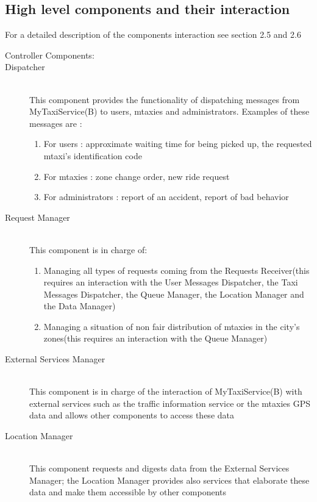\documentclass[11pt,titlepage]{article} %
\begin{document}
\subsection{High level components and their interaction}
	For a detailed description of the components interaction see section 2.5 and 2.6\newline
	\begin{description}
		\item [Controller Components:] 
		           \item [Dispatcher] \hfill \\
		           This component provides the functionality of dispatching messages from MyTaxiService(B) to users, mtaxies and administrators.\newline
		            Examples of these messages are :
			 \begin{enumerate}
			            \item For users : approximate waiting time for being picked up, the requested mtaxi's identification code
			            \item For mtaxies : zone change order, new ride request
			            \item For administrators : report of an accident, report of bad behavior
			\end{enumerate}
		        \item [Request Manager] \hfill \\
		           This component is in charge of:
			 \begin{enumerate}
			            \item Managing all types of requests coming from the Requests Receiver(this requires an
			            interaction with the User Messages Dispatcher, the Taxi Messages Dispatcher, the Queue Manager, the
			            Location Manager and the Data Manager)
			            \item Managing a situation of non fair distribution of mtaxies in the city's zones(this requires an interaction
			            with the Queue Manager)
			\end{enumerate}
		        \item [External Services Manager] \hfill \\
		            This component is in charge of the interaction of MyTaxiService(B) with external services such as
		            the traffic information service or the mtaxies GPS data and allows other components to access these data
		
		        \item  [Location Manager] \hfill \\
		            This component requests and digests data from the External Services Manager; the Location Manager
		            provides also services that elaborate these data and make them accessible by other components
		

\end{description}
\end{document}
